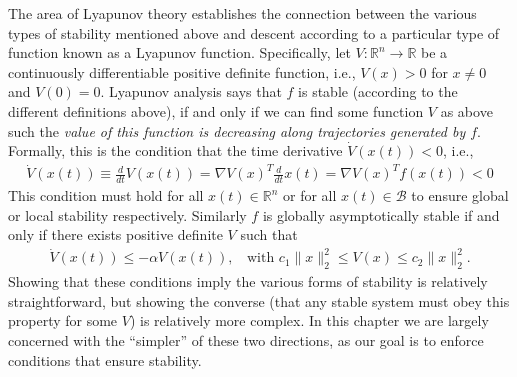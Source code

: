 The area of Lyapunov theory \citep{khalil2002nonlinear,la2012stability} establishes the connection between the various types of stability mentioned above and descent according to a particular type of function known as a Lyapunov function.  Specifically, let $V : \mathbb{R}^n \rightarrow \mathbb{R}$ be a continuously differentiable positive definite function, i.e., $V(x) > 0$ for $x \neq 0$ and $V(0) = 0$.  Lyapunov analysis says that $f$ is stable (according to the different definitions above), if and only if we can find some function $V$ as above such the \emph{value of this function is decreasing along trajectories generated by $f$}.  Formally, this is the condition that the time derivative $\dot{V}(x(t)) < 0$, i.e.,
\begin{align}
	\dot{V}(x(t)) \equiv \frac{d}{dt}V(x(t)) = \nabla V(x)^T \frac{d}{dt} x(t) = \nabla V(x)^T f(x(t)) < 0
\end{align}
This condition must hold for all $x(t) \in \mathbb{R}^n$ or for all $x(t) \in \mathcal B$ to ensure global or local stability respectively.  Similarly $f$ is globally asymptotically stable if and only if there exists positive definite $V$ such that
\begin{align}
	\dot{V}(x(t)) \leq -\alpha V(x(t)), \;\; \mbox{ with } c_1 \|x\|_2^2 \leq V(x) \leq c_2 \|x\|_2^2. \label{eqn:req_for_GAS}
\end{align}
Showing that these conditions imply the various forms of stability is relatively straightforward, but showing the converse (that any stable system must obey this property for some $V$) is relatively more complex.  In this chapter we are largely concerned with the ``simpler'' of these two directions, as our goal is to enforce conditions that ensure stability.


